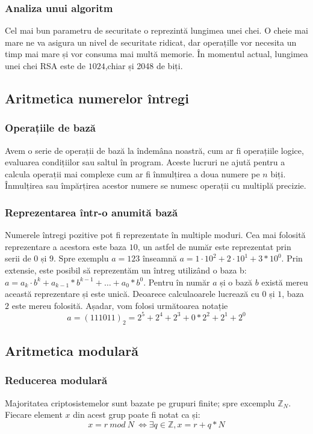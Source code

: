 \documentclass[12pt, oneside]{book}
\begin{document}
     \subsubsection{Analiza unui algoritm}
      Cel mai bun parametru de securitate o reprezintă lungimea unei chei. O cheie mai mare ne va
      asigura un nivel de securitate ridicat, dar operațille vor necesita un timp mai mare și vor consuma
      mai multă memorie. În momentul actual, lungimea unei chei RSA este de $1024$,chiar și 2048 de biți.
      
     \subsection{Aritmetica numerelor întregi}
      \subsubsection{Operațiile de bază}
       Avem o serie de operații de bază la îndemâna noastră, cum ar fi operațiile logice, evaluarea condițiilor sau saltul în program. Aceste lucruri ne ajută pentru a calcula operații mai complexe cum ar fi înmulțirea a doua numere pe $n$ biți. Înmulțirea sau împărțirea acestor numere se numesc operații cu multiplă precizie. 
      \subsubsection{Reprezentarea într-o anumită bază}
      Numerele întregi pozitive pot fi reprezentate în multiple moduri. Cea mai folosită reprezentare a acestora este baza $10$, un astfel de număr este reprezentat prin serii de $0$ și $9$. Spre exemplu $ a = 123 $ înseamnă $ a = 1 \cdot   10^2 + 2 \cdot 10^1 + 3*10^0$. Prin extensie, este posibil să reprezentăm un întreg utilizând o baza b: $ a = a_k \cdot   b^k + a_{k-1}*b^{k-1} +  \dots  + a_0*b^0 $. Pentru în număr $a$ și o bază $b$ există mereu această reprezentare și este unică. Deoarece calculaoarele lucrează cu $0$ și $1$, baza $2$ este mereu folosită. Așadar, vom folosi următoarea notație \\
      $$ a=(111011)_2 = 2^5 + 2^4 + 2^3 + 0*2^2 + 2^1 + 2^0 $$
      \subsection{Aritmetica modulară}
       \subsubsection{Reducerea modulară}
        Majoritatea criptosistemelor sunt bazate pe grupuri finite; spre excemplu $ \mathbb{Z}_N $. Fiecare element $x$ din acest grup poate fi notat ca și: \\
        $$ x = r  \ mod \ N \ \Leftrightarrow \exists q \in \mathbb{Z} , x = r+q*N$$
\end{document}
